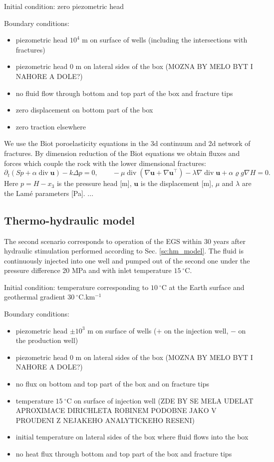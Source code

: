 \documentclass{article}
\renewcommand{\div}{\operatorname{div}}
\newcommand{\uu}{\vc u}
\newcommand{\vc}[1]{\boldsymbol{#1}}
\begin{document}
Initial condition: zero piezometric head

Boundary conditions:
\begin{itemize}
\item piezometric head $10^4$ m on surface of wells (including the intersections with fractures)
\item piezometric head 0 m on lateral sides of the box (MOZNA BY MELO BYT I NAHORE A DOLE?)
\item no fluid flow through bottom and top part of the box and fracture tips
\item zero displacement on bottom part of the box
\item zero traction elsewhere
\end{itemize}

We use the Biot poroelasticity equations in the 3d continuum and 2d network of fractures. By dimension reduction of the Biot equations we obtain fluxes and forces which couple the rock with the lower dimensional fractures:
\[ \partial_t(Sp + \alpha\div\uu) - k\Delta p = 0,\qquad -\mu\div(\nabla\uu+\nabla\uu^\top) - \lambda\nabla\div\uu + \alpha\varrho g\nabla H = 0. \]
Here $p=H-x_3$ is the pressure head [m], $\uu$ is the displacement [m], $\mu$ and $\lambda$ are the Lamé parameters [Pa].
...


\subsection{Thermo-hydraulic model}

The second scenario corresponds to operation of the EGS within 30 years after hydraulic stimulation performed according to Sec. \ref{sc:hm_model}.
The fluid is continuously injected into one well and pumped out of the second one under the pressure difference 20 MPa and with inlet temperature $15\ ^\circ$C.

Initial condition:
temperature corresponding to $10\ ^\circ$C at the Earth surface and geothermal gradient $30\ ^\circ$C.km${}^{-1}$

Boundary conditions:
\begin{itemize}
\item piezometric head $\pm10^3$ m on surface of wells ($+$ on the injection well, $-$ on the production well)
\item piezometric head 0 m on lateral sides of the box (MOZNA BY MELO BYT I NAHORE A DOLE?)
\item no flux on bottom and top part of the box and on fracture tips
\item temperature $15\ ^\circ$C on surface of injection well (ZDE BY SE MELA UDELAT APROXIMACE DIRICHLETA ROBINEM PODOBNE JAKO V PROUDENI Z NEJAKEHO ANALYTICKEHO RESENI)
\item initial temperature on lateral sides of the box where fluid flows into the box
\item no heat flux through bottom and top part of the box and fracture tips
\end{itemize}
\end{document}
